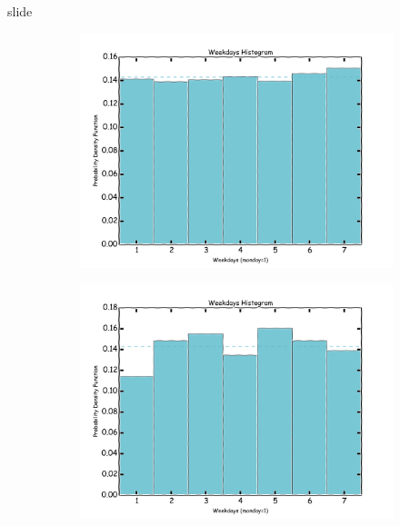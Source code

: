 \documentclass[ucs,8pt]{beamer}
\begin{document}
\begin{frame}{slide}
\begin{figure}[H]
	\centering
	\begin{subfigure}[b]{0.45\textheight}
		  	\centering
			\includegraphics[height=1.00\textheight]{hmtk_sa3_weekday}
			\label{fig:sa_week_hist}
	\end{subfigure}%
	\quad %
	\begin{subfigure}[b]{0.45\textheight}
		  	\centering
			\includegraphics[height=1.00\textheight]{hmtk_bsb2013_weekday}
			\label{fig:br_week_hist}
    \end{subfigure}%
          

\end{figure}
\end{frame}
\end{document}
